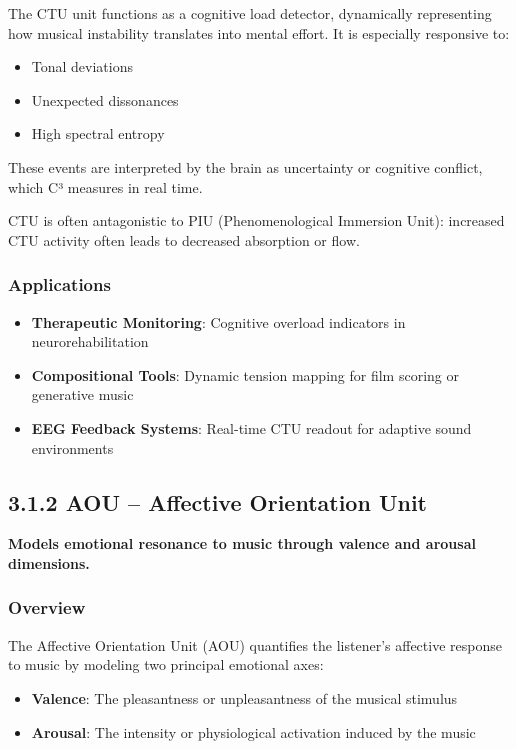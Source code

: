 \documentclass[10pt]{article}
\begin{document}
The CTU unit functions as a cognitive load detector, dynamically representing how musical instability translates into mental effort. It is especially responsive to:

\begin{itemize}
    \item Tonal deviations
    \item Unexpected dissonances
    \item High spectral entropy
\end{itemize}

These events are interpreted by the brain as uncertainty or cognitive conflict, which C³ measures in real time.

CTU is often antagonistic to PIU (Phenomenological Immersion Unit): increased CTU activity often leads to decreased absorption or flow.

\subsubsection*{Applications}

\begin{itemize}
    \item \textbf{Therapeutic Monitoring}: Cognitive overload indicators in neurorehabilitation
    \item \textbf{Compositional Tools}: Dynamic tension mapping for film scoring or generative music
    \item \textbf{EEG Feedback Systems}: Real-time CTU readout for adaptive sound environments
\end{itemize}

\subsection*{3.1.2 AOU – Affective Orientation Unit}

\textbf{Models emotional resonance to music through valence and arousal dimensions.}

\subsubsection*{Overview}

The Affective Orientation Unit (AOU) quantifies the listener’s affective response to music by modeling two principal emotional axes:

\begin{itemize}
    \item \textbf{Valence}: The pleasantness or unpleasantness of the musical stimulus
    \item \textbf{Arousal}: The intensity or physiological activation induced by the music
\end{itemize}
\end{document}
